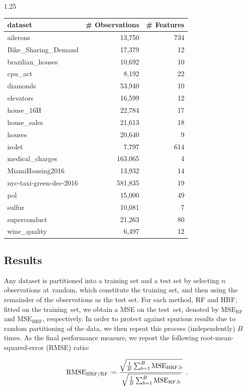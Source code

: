 \documentclass[12pt]{article}
\newcommand*{\defeq}{\mathrel{\vcenter{\baselineskip0.5ex\lineskiplimit0pt\hbox{\scriptsize.}\hbox{\scriptsize.}}}=}
\numberwithin{equation}{section}
\theoremstyle{plain}
\begin{document}
\begin{spacing}{1.25}
  
\begin{table}
\centering
\begin{tabular}{lrr}
\midrule
dataset   & \# Observations  & \; \; \# Features \\
\hline
ailerons & 13,750 & 734  \\
Bike\_Sharing\_Demand & 17,379 & 12  \\
brazilian\_houses & 10,692 & 10  \\
cpu\_act & 8,192 & 22 \\
diamonds & 53,940 & 10  \\
elevators & 16,599 & 12  \\
house\_16H & 22,784 & 17 \\
house\_sales & 21,613 & 18\\
houses & 20,640 & 9\\
isolet & 7,797 & 614\\
medical\_charges & 163,065 & 4\\
MiamiHousing2016 & 13,932 & 14\\
nyc-taxi-green-dec-2016 & 581,835 & 19 \\
pol & 15,000 & 49 \\
sulfur & 10,081 & 7 \\
superconduct & 21,263 & 80 \\
wine\_quality & 6,497 & 12\\
\bottomrule
\end{tabular}
\label{table:datasets}
\end{table}


\subsection{Results}
\label{sec:results}

Any dataset is partitioned into a training set and a test set by
selecting $n$ observations at~random, which constitute the training
set, and then using the remainder of the observations as the test set.
For each method, RF and HRF, fitted on the training~set, we obtain a MSE on
the test~set, denoted by MSE$_{\text{RF}}$ and  MSE$_{\text{HRF}}$,
respectively. In order to protect against spurious results
due to random partitioning of the data, we then
repeat this process (independently) $B$ times. As the final
performance measure, we report the following
root-mean-squared-error (RMSE) ratio:

\begin{equation}\label{eq:rmse-rat}
\text{RMSE}_{\text{HRF}/\text{RF}} \defeq 
  \frac{
  \sqrt{\frac{1}{B} \sum_{b=1}^B  \text{MSE}_{\text{HRF,b}}}}
  {\sqrt{\frac{1}{B} \sum_{b=1}^B  \text{MSE}_{\text{RF,b}}}}~.
\end{equation}


\end{spacing}
\end{document}
